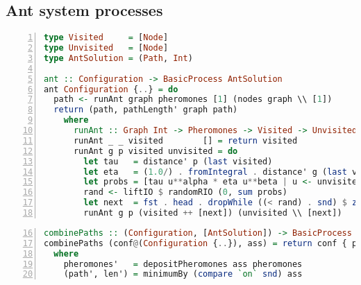 \begin{landscape}
\section{Ant system processes}
\label{app:ant_system_processes}

\begin{lstlisting}[language=Haskell,frame=tb,numbers=left,caption=Type aliases and the implementation of ants as a \textsf{BasicProcess}.]
type Visited     = [Node]
type Unvisited   = [Node]
type AntSolution = (Path, Int)

ant :: Configuration -> BasicProcess AntSolution
ant Configuration {..} = do
  path <- runAnt graph pheromones [1] (nodes graph \\ [1])
  return (path, pathLength' graph path)
    where
      runAnt :: Graph Int -> Pheromones -> Visited -> Unvisited -> BasicProcess Path
      runAnt _ _ visited        [] = return visited
      runAnt g p visited unvisited = do
        let tau   = distance' p (last visited)
        let eta   = (1.0/) . fromIntegral . distance' g (last visited)
        let probs = [tau u**alpha * eta u**beta | u <- unvisited]
        rand <- liftIO $ randomRIO (0, sum probs)
        let next  = fst . head . dropWhile ((< rand) . snd) $ zip unvisited (scanl1 (+) probs)
        runAnt g p (visited ++ [next]) (unvisited \\ [next])
\end{lstlisting}


\begin{lstlisting}[language=Haskell,frame=tb,numbers=left,caption=Implementation of a combinator process for ant solutions as \textsf{BasicProcess}.,firstnumber=16]
combinePaths :: (Configuration, [AntSolution]) -> BasicProcess Configuration
combinePaths (conf@(Configuration {..}), ass) = return conf { pheromones = pheromones', path = path', pathLen = len' }
  where
    pheromones'   = depositPheromones ass pheromones
    (path', len') = minimumBy (compare `on` snd) ass
\end{lstlisting}

\end{landscape}